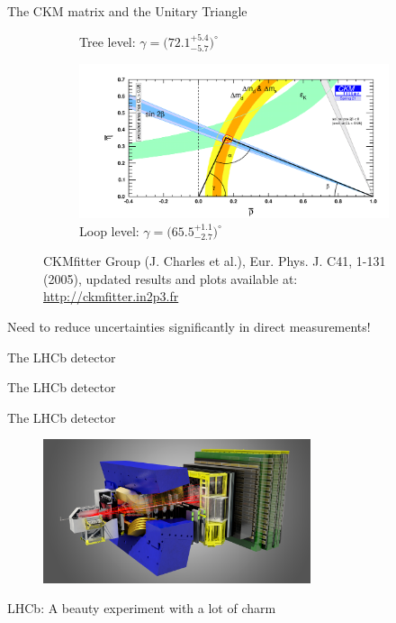 \documentclass[dvipsnames]{beamer}
\begin{document}
\begin{frame}{The CKM matrix and the Unitary Triangle}
\begin{figure}
\begin{subfigure}{0.5\textwidth}
      \caption*{Tree level: \colorbox{Cerulean!30}{$\gamma = \big(72.1^{+5.4}_{-5.7}\big)^\circ$}}
    \end{subfigure}%
    \begin{subfigure}{0.5\textwidth}
      \centering
      \includegraphics[width = 1.0\textwidth]{Plots/ckmfitter_loop.png}
      \caption*{Loop level: \colorbox{Cerulean!30}{$\gamma = \big(65.5^{+1.1}_{-2.7}\big)^\circ$}}
    \end{subfigure}
    \vspace{-0.3cm}
    \captionsetup{justification=centering}
    \caption*{\centering\tiny CKMfitter Group (J. Charles et al.), Eur. Phys. J. C41, 1-131 (2005), updated results and plots available at: \href{http://ckmfitter.in2p3.fr}{http://ckmfitter.in2p3.fr}}
  \end{figure}
  \vspace{-0.7cm}
  \begin{center}
    Need to reduce uncertainties significantly in direct measurements!
  \end{center}
\end{frame}

\begin{frame}{The LHCb detector}
  \begin{center}
    {\huge The LHCb detector}
  \end{center}
\end{frame}

\begin{frame}{The LHCb detector}
  \begin{figure}
    \centering
    \includegraphics[width = 0.7\textwidth]{Plots/LHCbDetector.png}
  \end{figure}
  \begin{center}
    \Large LHCb: A beauty experiment with a lot of charm
  \end{center}
\end{frame}
\end{document}
